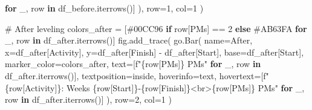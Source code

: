 \documentclass[
  letterpaper,
  DIV=11,
  numbers=noendperiod]{scrreprt}
\newenvironment{Shaded}{\begin{snugshade}}{\end{snugshade}}
\newcommand{\CommentTok}[1]{\textcolor[rgb]{0.37,0.37,0.37}{#1}}
\newcommand{\ControlFlowTok}[1]{\textcolor[rgb]{0.00,0.23,0.31}{\textbf{#1}}}
\newcommand{\DecValTok}[1]{\textcolor[rgb]{0.68,0.00,0.00}{#1}}
\newcommand{\KeywordTok}[1]{\textcolor[rgb]{0.00,0.23,0.31}{\textbf{#1}}}
\newcommand{\NormalTok}[1]{\textcolor[rgb]{0.00,0.23,0.31}{#1}}
\newcommand{\OperatorTok}[1]{\textcolor[rgb]{0.37,0.37,0.37}{#1}}
\newcommand{\SpecialCharTok}[1]{\textcolor[rgb]{0.37,0.37,0.37}{#1}}
\newcommand{\SpecialStringTok}[1]{\textcolor[rgb]{0.13,0.47,0.30}{#1}}
\newcommand{\StringTok}[1]{\textcolor[rgb]{0.13,0.47,0.30}{#1}}
\begin{document}
\begin{Shaded}
\begin{Highlighting}[]
                      \ControlFlowTok{for}\NormalTok{ \_, row }\KeywordTok{in}\NormalTok{ df\_before.iterrows()]}
\NormalTok{        ),}
\NormalTok{        row}\OperatorTok{=}\DecValTok{1}\NormalTok{, col}\OperatorTok{=}\DecValTok{1}
\NormalTok{    )}
    
    \CommentTok{\# After leveling}
\NormalTok{    colors\_after }\OperatorTok{=}\NormalTok{ [}\StringTok{\textquotesingle{}\#00CC96\textquotesingle{}} \ControlFlowTok{if}\NormalTok{ row[}\StringTok{\textquotesingle{}PMs\textquotesingle{}}\NormalTok{] }\OperatorTok{==} \DecValTok{2} \ControlFlowTok{else} \StringTok{\textquotesingle{}\#AB63FA\textquotesingle{}} \ControlFlowTok{for}\NormalTok{ \_, row }\KeywordTok{in}\NormalTok{ df\_after.iterrows()]}
\NormalTok{    fig.add\_trace(}
\NormalTok{        go.Bar(}
\NormalTok{            name}\OperatorTok{=}\StringTok{\textquotesingle{}After\textquotesingle{}}\NormalTok{,}
\NormalTok{            x}\OperatorTok{=}\NormalTok{df\_after[}\StringTok{\textquotesingle{}Activity\textquotesingle{}}\NormalTok{],}
\NormalTok{            y}\OperatorTok{=}\NormalTok{df\_after[}\StringTok{\textquotesingle{}Finish\textquotesingle{}}\NormalTok{] }\OperatorTok{{-}}\NormalTok{ df\_after[}\StringTok{\textquotesingle{}Start\textquotesingle{}}\NormalTok{],}
\NormalTok{            base}\OperatorTok{=}\NormalTok{df\_after[}\StringTok{\textquotesingle{}Start\textquotesingle{}}\NormalTok{],}
\NormalTok{            marker\_color}\OperatorTok{=}\NormalTok{colors\_after,}
\NormalTok{            text}\OperatorTok{=}\NormalTok{[}\SpecialStringTok{f"}\SpecialCharTok{\{}\NormalTok{row[}\StringTok{\textquotesingle{}PMs\textquotesingle{}}\NormalTok{]}\SpecialCharTok{\}}\SpecialStringTok{ PMs"} \ControlFlowTok{for}\NormalTok{ \_, row }\KeywordTok{in}\NormalTok{ df\_after.iterrows()],}
\NormalTok{            textposition}\OperatorTok{=}\StringTok{\textquotesingle{}inside\textquotesingle{}}\NormalTok{,}
\NormalTok{            hoverinfo}\OperatorTok{=}\StringTok{\textquotesingle{}text\textquotesingle{}}\NormalTok{,}
\NormalTok{            hovertext}\OperatorTok{=}\NormalTok{[}\SpecialStringTok{f"}\SpecialCharTok{\{}\NormalTok{row[}\StringTok{\textquotesingle{}Activity\textquotesingle{}}\NormalTok{]}\SpecialCharTok{\}}\SpecialStringTok{: Weeks }\SpecialCharTok{\{}\NormalTok{row[}\StringTok{\textquotesingle{}Start\textquotesingle{}}\NormalTok{]}\SpecialCharTok{\}}\SpecialStringTok{{-}}\SpecialCharTok{\{}\NormalTok{row[}\StringTok{\textquotesingle{}Finish\textquotesingle{}}\NormalTok{]}\SpecialCharTok{\}}\SpecialStringTok{\textless{}br\textgreater{}}\SpecialCharTok{\{}\NormalTok{row[}\StringTok{\textquotesingle{}PMs\textquotesingle{}}\NormalTok{]}\SpecialCharTok{\}}\SpecialStringTok{ PMs"} 
                      \ControlFlowTok{for}\NormalTok{ \_, row }\KeywordTok{in}\NormalTok{ df\_after.iterrows()]}
\NormalTok{        ),}
\NormalTok{        row}\OperatorTok{=}\DecValTok{2}\NormalTok{, col}\OperatorTok{=}\DecValTok{1}
\NormalTok{    )}
    

\end{Highlighting}
\end{Shaded}
\end{document}
